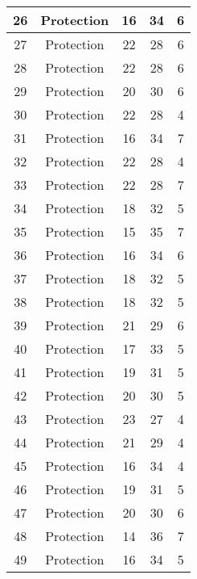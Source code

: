 \documentclass[results.tex]{subfiles}
\begin{document}
\begin{center}
\begin{tabular}{| c || c | c | c | c |}
    \hline
    26 & Protection & 16 & 34 & 6 \\ 
    \hline
    27 & Protection & 22 & 28 & 6 \\ 
    \hline
    28 & Protection & 22 & 28 & 6 \\ 
    \hline
    29 & Protection & 20 & 30 & 6 \\ 
    \hline
    30 & Protection & 22 & 28 & 4 \\ 
    \hline
    31 & Protection & 16 & 34 & 7 \\ 
    \hline
    32 & Protection & 22 & 28 & 4 \\ 
    \hline
    33 & Protection & 22 & 28 & 7 \\ 
    \hline
    34 & Protection & 18 & 32 & 5 \\ 
    \hline
    35 & Protection & 15 & 35 & 7 \\ 
    \hline
    36 & Protection & 16 & 34 & 6 \\ 
    \hline
    37 & Protection & 18 & 32 & 5 \\ 
    \hline
    38 & Protection & 18 & 32 & 5 \\ 
    \hline
    39 & Protection & 21 & 29 & 6 \\ 
    \hline
    40 & Protection & 17 & 33 & 5 \\ 
    \hline
    41 & Protection & 19 & 31 & 5 \\ 
    \hline
    42 & Protection & 20 & 30 & 5 \\ 
    \hline
    43 & Protection & 23 & 27 & 4 \\ 
    \hline
    44 & Protection & 21 & 29 & 4 \\ 
    \hline
    45 & Protection & 16 & 34 & 4 \\ 
    \hline
    46 & Protection & 19 & 31 & 5 \\ 
    \hline
    47 & Protection & 20 & 30 & 6 \\ 
    \hline
    48 & Protection & 14 & 36 & 7 \\ 
    \hline
    49 & Protection & 16 & 34 & 5 \\ 
    \hline   \end{tabular}
\end{center}
\end{document}
